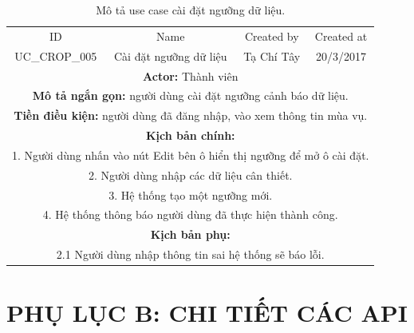 \documentclass[a4paper,12pt,oneside]{article}
\begin{document}
\begin{table}[!htp]
\centering
\begin{tabularx}{\linewidth}{ |c||c|c|c| }
\hline
ID & Name & Created by & Created at\\
UC\_CROP\_005 & Cài đặt ngưỡng dữ liệu & Tạ Chí Tây & 20/3/2017\\
\hline
\multicolumn{4}{|X|}{\textbf{Actor:} Thành viên }\\
\hline
\multicolumn{4}{|X|}{\textbf{Mô tả ngắn gọn:} người dùng cài đặt ngưỡng cảnh báo dữ liệu. }\\
\hline
\multicolumn{4}{|X|}{\textbf{Tiền điều kiện:} người dùng đã đăng nhập, vào xem thông tin mùa vụ.}\\
\hline
\multicolumn{4}{|X|}{\textbf{Kịch bản chính:}}\\
\multicolumn{4}{|X|}{ 1.	Người dùng nhấn vào nút Edit bên ô hiển thị ngưỡng để mở ô cài đặt.}\\
\multicolumn{4}{|X|}{
2.	Người dùng nhập các dữ liệu cân thiết.}\\
\multicolumn{4}{|X|}{
3.	Hệ thống tạo một ngưỡng mới.}\\

\multicolumn{4}{|X|}{4. Hệ thống thông báo người dùng đã thực hiện thành công.}\\
\hline
\multicolumn{4}{|X|}{\textbf{Kịch bản phụ:}}\\
\multicolumn{4}{|X|}{2.1    Người dùng nhập thông tin sai hệ thống sẽ báo lỗi.}\\
\hline

\end{tabularx}
\caption{Mô tả use case cài đặt ngưỡng dữ liệu.}
\end{table}

\newpage
\section{PHỤ LỤC B: CHI TIẾT CÁC API}
\end{document}
